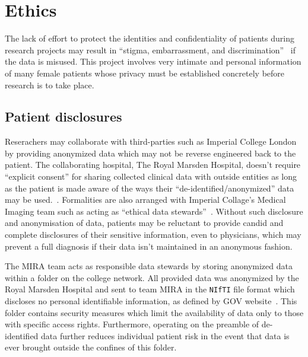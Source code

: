 \documentclass[12pt,twoside]{report}
\begin{document}
\chapter{Ethics}

The lack of effort to protect the identities and confidentiality of patients during research projects may result in ``stigma, embarrassment, and discrimination''~\cite{health-privacy} if the data is misused.
This project involves very intimate and personal information of many female patients whose privacy must be established concretely before research is to take place.%

\section{Patient disclosures}

Reserachers may collaborate with third-parties such as Imperial College London by providing anonymized data which may not be reverse engineered back to the patient. The collaborating hospital, The Royal Marsden Hospital, doesn't require ``explicit consent'' for sharing collected clinical data with outside entities as long as the patient is made aware of the ways their ``de-identified/anonymized'' data may be used.~\cite{royal-marsden-privacy-note}. Formalities are also arranged with Imperial Collage's Medical Imaging team such as acting as ``ethical data stewards''~\cite{Larson2020-ib}. Without such disclosure and anonymisation of data, patients may be reluctant to provide candid and complete disclosures of their sensitive information, even to physicians, which may prevent a full diagnosis if their data isn't maintained in an anonymous fashion.

The MIRA team acts as responsible data stewards by storing anonymized data within a folder on the college network. All provided data was anonymized by the Royal Marsden Hospital and sent to team MIRA in the \texttt{NIfTI} file format which discloses no personal identifiable information, as defined by GOV website~\cite{gov-gdpr}. This folder contains security measures which limit the availability of data only to those with specific access rights. Furthermore, operating on the preamble of de-identified data further reduces individual patient risk in the event that data is ever brought outside the confines of this folder.
\end{document}
